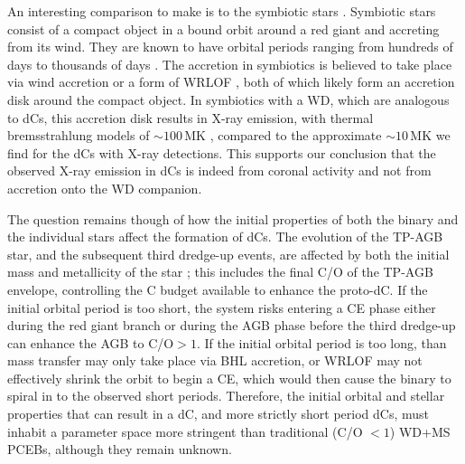 \documentclass[twocolumn, tighten, times, astrosymb]{aastex631}
\begin{document}
An interesting comparison to make is to the symbiotic stars \citep{Davidsen1976, Allen1984, Luna2013}. Symbiotic stars consist of a compact object in a bound orbit around a red giant and accreting from its wind. They are known to have orbital periods ranging from hundreds of days to thousands of days \citep{Mikolajewska2012}. The accretion in symbiotics is believed to take place via wind accretion or a form of WRLOF \citep{Luna2018}, both of which likely form an accretion disk around the compact object. In symbiotics with a WD, which are analogous to dCs, this accretion disk results in X-ray emission, with thermal bremsstrahlung models of $\sim 100$\,MK \citep{Chernyakova2005, Tueller2005, Mukai2007, Smith2008, Kennea2009, Luna2013, Luna2018, Danehkar2021}, compared to the approximate $\sim10$\,MK we find for the dCs with X-ray detections. This supports our conclusion that the observed X-ray emission in dCs is indeed from coronal activity and not from accretion onto the WD companion.

The question remains though of how the initial properties of both the binary and the individual stars affect the formation of dCs. The evolution of the TP-AGB star, and the subsequent third dredge-up events, are affected by both the initial mass and metallicity of the star \citep{Kalirai2014}; this includes the final C/O of the TP-AGB envelope, controlling the C budget available to enhance the proto-dC. If the initial orbital period is too short, the system risks entering a CE phase either during the red giant branch or during the AGB phase before the third dredge-up can enhance the AGB to C/O$ > 1$. If the initial orbital period is too long, than mass transfer may only take place via BHL accretion, or WRLOF may not effectively shrink the orbit to begin a CE, which would then cause the binary to spiral in to the observed short periods. Therefore, the initial orbital and stellar properties that can result in a dC, and more strictly short period dCs, must inhabit a parameter space more stringent than traditional (C/O $< 1$) WD+MS PCEBs, although they remain unknown.
\end{document}
